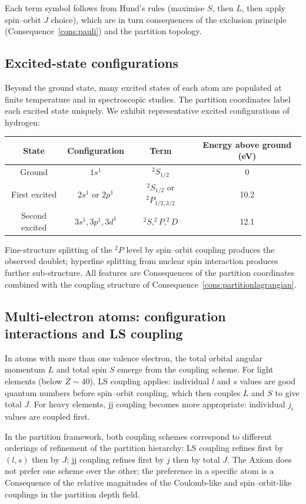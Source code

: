\documentclass[11pt,twocolumn,a4paper]{article}
\theoremstyle{axiomstyle}
\theoremstyle{conseqstyle}
\theoremstyle{definition}
\theoremstyle{remark}
\begin{document}
Each term symbol follows from Hund's rules (maximise $S$, then $L$, then apply spin--orbit $J$ choice), which are in turn consequences of the exclusion principle (Consequence~\ref{cons:pauli}) and the partition topology.

\subsection{Excited-state configurations}

Beyond the ground state, many excited states of each atom are populated at finite temperature and in spectroscopic studies. The partition coordinates label each excited state uniquely. We exhibit representative excited configurations of hydrogen:
\begin{center}
\begin{tabular}{c|c|c|c}
\toprule
State & Configuration & Term & Energy above ground (eV)\\
\midrule
Ground & $1s^{1}$ & $^{2}S_{1/2}$ & 0 \\
First excited & $2s^{1}$ or $2p^{1}$ & $^{2}S_{1/2}$ or $^{2}P_{1/2,3/2}$ & 10.2 \\
Second excited & $3s^{1},3p^{1},3d^{1}$ & $^{2}S,^{2}P,^{2}D$ & 12.1 \\
\bottomrule
\end{tabular}
\end{center}
Fine-structure splitting of the $^{2}P$ level by spin--orbit coupling produces the observed doublet; hyperfine splitting from nuclear spin interaction produces further sub-structure. All features are Consequences of the partition coordinates combined with the coupling structure of Consequence~\ref{cons:partitionlagrangian}.

\subsection{Multi-electron atoms: configuration interactions and LS coupling}

In atoms with more than one valence electron, the total orbital angular momentum $L$ and total spin $S$ emerge from the coupling scheme. For light elements (below $Z\sim 40$), LS coupling applies: individual $l$ and $s$ values are good quantum numbers before spin--orbit coupling, which then couples $L$ and $S$ to give total $J$. For heavy elements, jj coupling becomes more appropriate: individual $j_{i}$ values are coupled first.

In the partition framework, both coupling schemes correspond to different orderings of refinement of the partition hierarchy: LS coupling refines first by $(l,s)$ then by $J$; jj coupling refines first by $j$ then by total $J$. The Axiom does not prefer one scheme over the other; the preference in a specific atom is a Consequence of the relative magnitudes of the Coulomb-like and spin--orbit-like couplings in the partition depth field.
\end{document}

